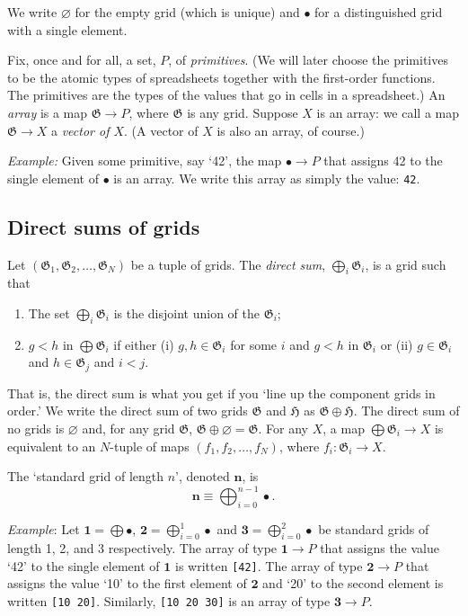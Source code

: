 \documentclass[11pt]{article}
\newcommand{\gr}[1]{\mathfrak{#1}}
\newcommand{\GG}{\gr{G}}
\newcommand{\void}{\varnothing}
\newcommand{\unit}{\bullet}
\newcommand{\one}{\mathbf{1}}
\newcommand{\two}{\mathbf{2}}
\newcommand{\three}{\mathbf{3}}
\begin{document}
We write \(\void\) for the empty grid (which is unique) and $\unit$ for a
distinguished grid with a single element. 

Fix, once and for all, a set, \(P\), of \emph{primitives}. (We will later choose
the primitives to be the atomic types of spreadsheets together with the
first-order functions. The primitives are the types of the values that go in
cells in a spreadsheet.) An \emph{array} is a map $\gr{G} \to P$, where $\gr{G}$
is any grid. Suppose $X$ is an array: we call a map $\gr{G} \to X$ a \emph{vector
of $X$}. (A vector of $X$ is also an array, of course.)

\emph{Example:} Given some primitive, say `42', the map $\unit \to P$ that assigns 42
to the single element of $\unit$ is an array. We write this array as simply the
value: \verb|42|.

\subsection{Direct sums of grids}

Let \((\GG_1, \GG_2, \dots, \GG_N)\) be a tuple of grids. The \emph{direct sum},
\(\bigoplus_i \GG_i\), is a grid such that
\begin{enumerate}
\item The set \(\bigoplus_i \GG_i\) is the disjoint union of the \(\GG_i\);
\item \(g<h\) in \(\bigoplus \GG_i\) if either (i) \(g, h\in \GG_i\) for some \(i\) and \(g<h\)
in \(\GG_i\) or (ii) \(g\in\GG_i\) and \(h\in\GG_j\) and \(i < j\).
\end{enumerate}
That is, the direct sum is what you get if you `line up the component grids in
order.' We write the direct sum of two grids \(\gr{G}\) and \(\gr{H}\) as
\(\gr{G}\oplus \gr{H}\). The direct sum of no grids is $\void$ and, for any grid
$\GG$, \(\GG\oplus\void = \GG\). For any \(X\), a map \(\bigoplus \GG_i\to X\) is
equivalent to an \(N\)-tuple of maps \((f_1, f_2, \dots, f_N)\), where \(f_i :
\GG_i\to X\).

The `standard grid of length $n$', denoted $\mathbf{n}$, is
\begin{equation*}
\mathbf{n} \equiv \bigoplus_{i=0}^{n-1} \unit.
\end{equation*}

\emph{Example}: Let $\one = \bigoplus\unit $, $\two = \bigoplus_{i=0}^1 \unit$ and
$\three = \bigoplus_{i=0}^2 \unit$ be standard grids of length 1, 2, and 3
respectively. The array of type $\one \to P$ that assigns the value `42' to the
single element of $\one$ is written \verb|[42]|. The array of type $\two \to P$
that assigns the value `10' to the first element of $\two$ and `20' to the
second element is written \verb|[10 20]|. Similarly, \verb|[10 20 30]| is an
array of type $\three \to P$. 
\end{document}
